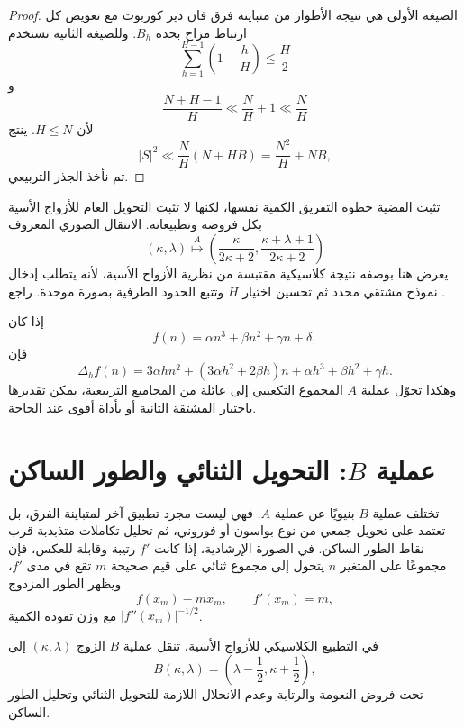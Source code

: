 \begin{proof}
الصيغة الأولى هي نتيجة الأطوار من متباينة فرق فان دير كوربوت مع تعويض كل ارتباط مزاح بحده \(B_h\). وللصيغة الثانية نستخدم
\[
\sum_{h=1}^{H-1}\left(1-\frac{h}{H}\right)\le \frac H2
\]
و
\[
\frac{N+H-1}{H}\ll \frac NH+1\ll\frac NH
\]
لأن \(H\le N\). ينتج
\[
|S|^2\ll \frac NH(N+HB)=\frac{N^2}{H}+NB,
\]
ثم نأخذ الجذر التربيعي.
\end{proof}

\begin{remark}
تثبت القضية خطوة التفريق الكمية نفسها، لكنها لا تثبت التحويل العام للأزواج الأسية بكل فروضه وتطبيعاته. الانتقال الصوري المعروف
\[
(\kappa,\lambda)
\stackrel{A}{\longmapsto}
\left(
\frac{\kappa}{2\kappa+2},
\frac{\kappa+\lambda+1}{2\kappa+2}
\right)
\]
يعرض هنا بوصفه نتيجة كلاسيكية مقتبسة من نظرية الأزواج الأسية، لأنه يتطلب إدخال نموذج مشتقي محدد ثم تحسين اختيار \(H\) وتتبع الحدود الطرفية بصورة موحدة.
راجع \cite[الفصل~3، الصفحات~21--37]{GrahamKolesnik1991}.
\end{remark}

\begin{example}
إذا كان
\[
f(n)=\alpha n^3+\beta n^2+\gamma n+\delta,
\]
فإن
\[
\Delta_hf(n)
=3\alpha h n^2+(3\alpha h^2+2\beta h)n+
\alpha h^3+\beta h^2+\gamma h.
\]
وهكذا تحوّل عملية \(A\) المجموع التكعيبي إلى عائلة من المجاميع التربيعية، يمكن تقديرها باختبار المشتقة الثانية أو بأداة أقوى عند الحاجة.
\end{example}

\section{عملية \(B\): التحويل الثنائي والطور الساكن}

تختلف عملية \(B\) بنيويًا عن عملية \(A\). فهي ليست مجرد تطبيق آخر لمتباينة الفرق، بل تعتمد على تحويل جمعي من نوع بواسون أو فوروني، ثم تحليل تكاملات متذبذبة قرب نقاط الطور الساكن. في الصورة الإرشادية، إذا كانت \(f'\) رتيبة وقابلة للعكس، فإن مجموعًا على المتغير \(n\) يتحول إلى مجموع ثنائي على قيم صحيحة \(m\) تقع في مدى \(f'\)، ويظهر الطور المزدوج
\[
f(x_m)-m x_m,
\qquad f'(x_m)=m,
\]
مع وزن تقوده الكمية \(|f''(x_m)|^{-1/2}\).

\begin{proposition}
\label{prop:b-process-cited}
في التطبيع الكلاسيكي للأزواج الأسية، تنقل عملية \(B\) الزوج \((\kappa,\lambda)\) إلى
\[
B(\kappa,\lambda)
=
\left(\lambda-\frac12,\kappa+\frac12\right),
\]
تحت فروض النعومة والرتابة وعدم الانحلال اللازمة للتحويل الثنائي وتحليل الطور الساكن.
\end{proposition}

